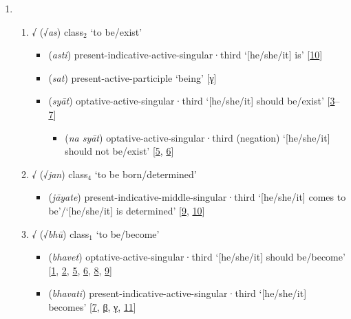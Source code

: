 \begin{enumerate}
\item   \begin{enumerate}
        \item √ (√\textit{as}) \acrshort{class}$_\text{2}$  `to be/exist'
        \begin{itemize}
            \item {} (\textit{asti}) \acrshort{present}-\acrshort{indicative}-\acrshort{active}-\acrshort{singular}·\acrshort{third} `[he/she/it] is' [\hyperlink{Spass10}{10}]
            \item {} (\textit{sat}) \acrshort{present}-\acrshort{active}-\acrshort{participle} `being' [\hyperlink{SpassC}{γ}]        
            \item {} (\textit{syāt}) \acrshort{optative}-\acrshort{active}-\acrshort{singular}·\acrshort{third} `[he/she/it] should be/exist' [\hyperlink{Spass3}{3}--\hyperlink{Spass7}{7}]
                \begin{itemize}
                \item {} (\textit{na syāt}) \acrshort{optative}-\acrshort{active}-\acrshort{singular}·\acrshort{third} (\acrshort{negation}) `[he/she/it] should not be/exist' [\hyperlink{Spass5}{5}, \hyperlink{Spass6}{6}]
                \end{itemize}
        \end{itemize}
        \item √ (√\textit{jan}) \acrshort{class}$_\text{4}$  `to be born/determined'
        \begin{itemize}
            \item {} (\textit{jāyate}) \acrshort{present}-\acrshort{indicative}-\acrshort{middle}-\acrshort{singular}·\acrshort{third} `[he/she/it] comes to be'/`[he/she/it] is determined' [\hyperlink{Spass9}{9}, \hyperlink{Spass10}{10}]
       \end{itemize}
       \item √ (√\textit{bhū}) \acrshort{class}$_\text{1}$  `to be/become'
        \begin{itemize}
            \item {} (\textit{bhavet}) \acrshort{optative}-\acrshort{active}-\acrshort{singular}·\acrshort{third} `[he/she/it] should be/become' [\hyperlink{Spass1}{1}, \hyperlink{Spass2}{2}, \hyperlink{Spass5}{5}, \hyperlink{Spass6}{6}, \hyperlink{Spass8}{8}, \hyperlink{Spass9}{9}]
            \item {} (\textit{bhavati}) \acrshort{present}-\acrshort{indicative}-\acrshort{active}-\acrshort{singular}·\acrshort{third} `[he/she/it] becomes' [\hyperlink{Spass7}{7}, \hyperlink{SpassB}{β}, \hyperlink{SpassC}{γ}, \hyperlink{Spass11}{11}]

\end{itemize}
\end{enumerate}
\end{enumerate}
